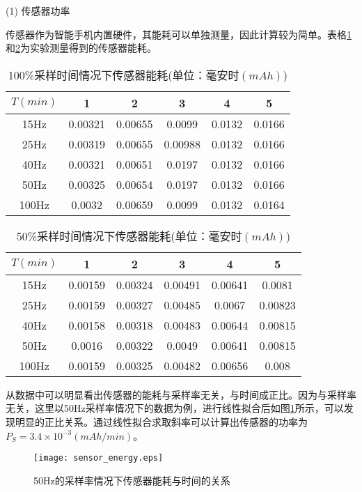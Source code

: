 	(1) 传感器功率
\par 传感器作为智能手机内置硬件，其能耗可以单独测量，因此计算较为简单。表格\ref{100_energy}和\ref{50_energy}为实验测量得到的传感器能耗。

\begin{table}[htb]
    \centering
    \caption{100\%采样时间情况下传感器能耗(单位：毫安时$(mAh)$)}\label{100_energy}
    \begin{tabular}{cccccc}
    \toprule
     $T(min)$ & 1 & 2 & 3 & 4 & 5 \\
    \midrule
    15Hz & 0.00321 & 0.00655 & 0.0099 & 0.0132 & 0.0166 \\
    25Hz & 0.00319 & 0.00655 & 0.00988 & 0.0132 & 0.0166 \\
    40Hz & 0.00321 & 0.00651 & 0.0197 & 0.0132 & 0.0166 \\
    50Hz & 0.00325 & 0.00654 & 0.0197 & 0.0132 & 0.0166 \\
    100Hz & 0.0032 & 0.00659 & 0.0099 & 0.0132 & 0.0164 \\
    \bottomrule
    \end{tabular}
 \end{table}

 \begin{table}[htb]
    \centering
    \caption{50\%采样时间情况下传感器能耗(单位：毫安时$(mAh)$)}\label{50_energy}
    \begin{tabular}{cccccc}
    \toprule
     $T(min)$ & 1 & 2 & 3 & 4 & 5 \\
    \midrule
    15Hz & 0.00159 & 0.00324 & 0.00491 & 0.00641 & 0.0081 \\
    25Hz & 0.00159 & 0.00327 & 0.00485 & 0.0067 & 0.00823 \\
    40Hz & 0.00158 & 0.00318 & 0.00483 & 0.00644 & 0.00815 \\
    50Hz & 0.0016 & 0.00322 & 0.0049 & 0.00641 & 0.00815 \\
    100Hz & 0.00159 & 0.00325 & 0.00482 & 0.00656 & 0.008 \\
    \bottomrule
    \end{tabular}
 \end{table}


\par 从数据中可以明显看出传感器的能耗与采样率无关，与时间成正比。因为与采样率无关，这里以50Hz采样率情况下的数据为例，进行线性拟合后如图\ref{sensor_energy}所示，可以发现明显的正比关系。通过线性拟合求取斜率可以计算出传感器的功率为$P_S = 3.4 \times 10^{-3} (mAh/min)$。

\begin{figure}[htb]
\centering
\texttt{[image: sensor\_energy.eps]}
\caption{50Hz的采样率情况下传感器能耗与时间的关系}\label{sensor_energy}
\end{figure}

